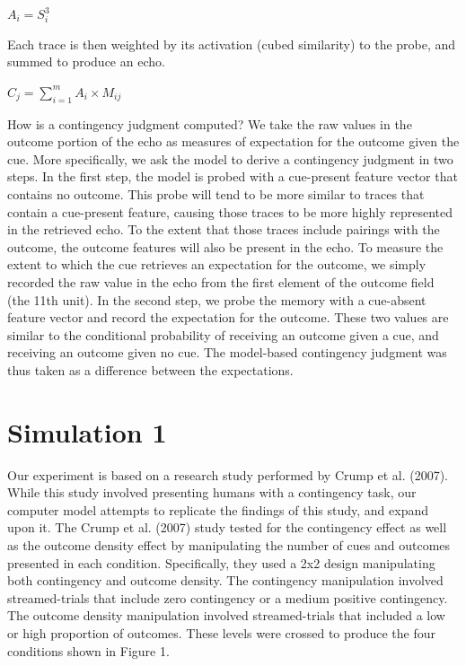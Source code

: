 \documentclass[
  english,
  man,floatsintext]{apa6}
\begin{document}
\(A_i = S_i^3\)

Each trace is then weighted by its activation (cubed similarity) to the probe, and summed to produce an echo.

\(C_j = \sum_{i=1}^m A_i \times M_{ij}\)

How is a contingency judgment computed? We take the raw values in the outcome portion of the echo as measures of expectation for the outcome given the cue. More specifically, we ask the model to derive a contingency judgment in two steps. In the first step, the model is probed with a cue-present feature vector that contains no outcome. This probe will tend to be more similar to traces that contain a cue-present feature, causing those traces to be more highly represented in the retrieved echo. To the extent that those traces include pairings with the outcome, the outcome features will also be present in the echo. To measure the extent to which the cue retrieves an expectation for the outcome, we simply recorded the raw value in the echo from the first element of the outcome field (the 11th unit). In the second step, we probe the memory with a cue-absent feature vector and record the expectation for the outcome. These two values are similar to the conditional probability of receiving an outcome given a cue, and receiving an outcome given no cue. The model-based contingency judgment was thus taken as a difference between the expectations.

\hypertarget{simulation-1}{%
\section{Simulation 1}\label{simulation-1}}

Our experiment is based on a research study performed by Crump et al. (2007). While this study involved presenting humans with a contingency task, our computer model attempts to replicate the findings of this study, and expand upon it. The Crump et al. (2007) study tested for the contingency effect as well as the outcome density effect by manipulating the number of cues and outcomes presented in each condition. Specifically, they used a 2x2 design manipulating both contingency and outcome density. The contingency manipulation involved streamed-trials that include zero contingency or a medium positive contingency. The outcome density manipulation involved streamed-trials that included a low or high proportion of outcomes. These levels were crossed to produce the four conditions shown in Figure 1.
\end{document}
